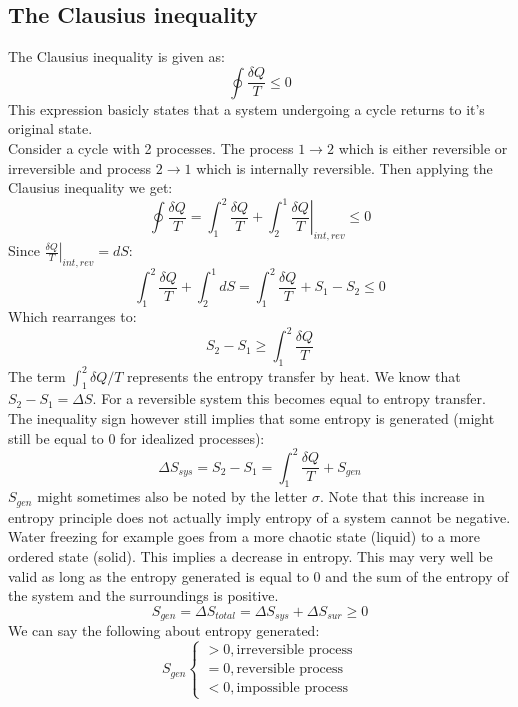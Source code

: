 \documentclass[11pt, a4paper]{article}
\begin{document}
\subsection{The Clausius inequality}
The Clausius inequality is given as:
\begin{equation}
  \oint \frac{\delta Q}{T} \leq 0
\end{equation}
This expression basicly states that a system undergoing a cycle returns to it's original state.\\
Consider a cycle with 2 processes. The process $1 \to 2$ which is either reversible or irreversible and process $2 \to 1$ which is internally reversible. Then applying the Clausius inequality we get:
\begin{equation}
  \oint \frac{\delta Q}{T} = \int_1^2 \frac{\delta Q}{T} + \int_2^1 \left. \frac{\delta Q}{T} \right|_{int,rev} \leq 0
\end{equation}
Since $\left. \frac{\delta Q}{T}\right|_{int,rev} = dS$:
\begin{equation}
  \int_1^2 \frac{\delta Q}{T} + \int_2^1 dS = \int_1^2 \frac{\delta Q}{T} + S_1 - S_2 \leq 0
\end{equation}
Which rearranges to:
\begin{equation}
  S_2 - S_1 \geq \int_1^2 \frac{\delta Q}{T}
\end{equation}
The term $\int_1^2 \delta Q/T$ represents the entropy transfer by heat. We know that $S_2 - S_1 = \Delta S$. For a reversible system this becomes equal to entropy transfer. The inequality sign however still implies that some entropy is generated (might still be equal to 0 for idealized processes):
\begin{equation}
  \Delta S_{sys} = S_2 - S_1 = \int_1^2 \frac{\delta Q}{T} + S_{gen}
\end{equation}
$S_{gen}$ might sometimes also be noted by the letter $\sigma$. Note that this increase in entropy principle does not actually imply entropy of a system cannot be negative. Water freezing for example goes from a more chaotic state (liquid) to a more ordered state (solid). This implies a decrease in entropy. This may very well be valid as long as the entropy generated is equal to $0$ and the sum of the entropy of the system and the surroundings is positive.
\begin{equation}
  S_{gen} = \Delta S_{total} = \Delta S_{sys} + \Delta S_{sur} \geq 0
\end{equation}
We can say the following about entropy generated:
\begin{equation}
  S_{gen}
  \begin{cases}
    > 0, \text{irreversible process}\\
    = 0, \text{reversible process}\\
    < 0, \text{impossible process}
  \end{cases}
\end{equation}
\end{document}
